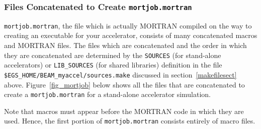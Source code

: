 \documentclass[12pt,twoside]{article}
\begin{document}
\subsubsection{Files Concatenated to Create {\tt mortjob.mortran}}
\label{mortjobsect}

{\tt mortjob.mortran}, the file which is actually MORTRAN compiled on the
way to creating an executable for your accelerator, consists of
many concatenated macros and MORTRAN files.  The files which are concatenated
and the order in which they are concatenated are determined by the
{\tt SOURCES} (for stand-alone accelerators) or
{\tt LIB\_SOURCES} (for shared libraries) definition in the file
{\tt \$EGS\_HOME/BEAM\_myaccel/sources.make}
discussed in section~\ref{makefilesect} above.  Figure~\ref{fig_mortjob}
below shows all the files that are concatenated to create a {\tt mortjob.mortran} for a stand-alone accelerator simulation.

Note that macros must appear before the MORTRAN code in which they are
used.  Hence, the first portion of {\tt mortjob.mortran} consists entirely
of macro files.
\end{document}
